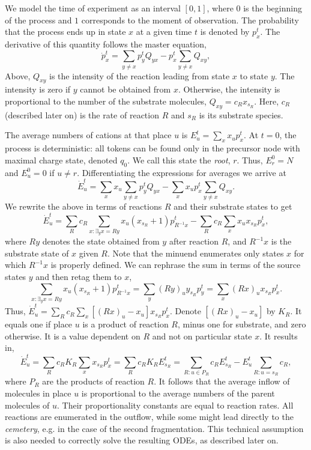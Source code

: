 \documentclass{llncs}
\begin{document}
We model the time of experiment as an interval $[0,1]$, where $0$ is the beginning of the process and $1$ corresponds to the moment of observation. The probability that the process ends up in state $x$ at a given time $t$ is denoted by $p_x^t$. The derivative of this quantity follows the master equation,
        $$\dot{p}_x^t = \sum_{y\not=x} p_y^t Q_{yx} - p_x^t \sum_{y\not=x} Q_{xy},$$
Above, $Q_{xy}$ is the intensity of the reaction leading from state $x$ to state $y$. The intensity is zero if $y$ cannot be obtained from $x$. Otherwise, the intensity is proportional to the number of the substrate molecules, $Q_{xy}=c_R x_{s_R}$. Here, $c_R$ (described later on) is the rate of reaction $R$ and $s_R$ is its substrate species.

The average numbers of cations at that place $u$ is $E_u^t= \sum_x x_up_x^t$.
At $t=0$, the process is deterministic: all tokens can be found only in the precursor node with maximal charge state, denoted $q_0$.  We call this state the \textit{root}, $r$.
Thus, $E_r^0=N$ and $E_u^0=0$ if $u \not= r$. Differentiating the expressions for averages we arrive at
        $$\dot E_u^t=\sum_x x_u \sum_{y\not=x} p_y^t Q_{yx} -\sum_x x_u p_x^t \sum_{y\not=x} Q_{xy}.$$
We rewrite the above in terms of reactions $R$ and their substrate states to get
        $$\dot E_u^t = \sum_R c_R \sum_{x: \exists_y x=Ry}  x_u (x_{s_R}+1) p_{R^{-1}x}^t- \sum_R c_R \sum_{x} x_u x_{s_R} p_x^t,$$
where $Ry$ denotes the state obtained from $y$ after reaction $R$,
and $R^{-1}x$ is the substrate state of $x$ given $R$.
Note that the minuend enumerates only states $x$ for which $R^{-1}x$ is properly defined.
We can rephrase the sum in terms of the source states $y$ and then retag them to $x$,
        $$\sum_{x:\exists_y x=Ry} x_u (x_{s_R}+1) p_{R^{-1}x}^t = \sum_{y}  (Ry)_u y_{s_R} p_y^t = \sum_x (Rx)_u x_{s_R} p_x^t.$$
Thus, $\dot E_u^t = \sum_R c_R \sum_x   \left[(Rx)_u-x_u \right] x_{s_R} p_x^t$. Denote $\left[(Rx)_u-x_u\right]$ by $K_R$. It equals one if place $u$ is a product of reaction $R$, minus one for substrate, and zero otherwise.
It is a value dependent on $R$ and not on particular state $x$.
It results in,
        $$\dot E_u^t = \sum_R c_R K_R \sum_x x_{s_R} p_x^t = \sum_R c_R K_R E_{s_R}^t = \sum_{R:u\in P_R} c_R E_{s_R}^t - E_u^t \sum_{R: u=s_R}c_R,$$
where $P_R$ are the products of reaction $R$.
It follows that the average inflow of molecules in place $u$ is proportional to the average numbers of the parent molecules of $u$.
Their proportionality constants are equal to reaction rates.
All reactions are enumerated in the outflow, while some might lead directly to the \textit{cemetery}, e.g. in the case of the second fragmentation. This technical assumption is also needed to correctly solve the resulting ODEs, as described later on.
\end{document}
